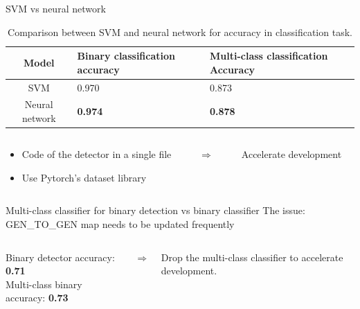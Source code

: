 \documentclass[11pt,compress]{beamer} %
\begin{document}
\begin{frame}{SVM vs neural network}
  \begin{table}[H]
    \centering
    \begin{tabular}{|c|p{}|p{}|}
        \hline
        Model & Binary classification accuracy & Multi-class classification Accuracy\\
        \hline
        SVM & 0.970 & 0.873\\
        \hline
        Neural network & \textbf{0.974} & \textbf{0.878}\\
        \hline
    \end{tabular}
    \caption{Comparison between SVM and neural network for accuracy in classification task.}
    \label{table:svmVsNN}
  \end{table}
  
  \pause
  \begin{columns}
    \begin{column}{.4\textwidth}
      \begin{itemize}
        \item Code of the detector in a single file
        \pause
        \item Use Pytorch's dataset library
      \end{itemize}
    \end{column}
    \pause
    \begin{column}{.05\textwidth}
      \Huge
      $\Rightarrow$
    \end{column}

    \begin{column}{.4\textwidth}
      Accelerate development
    \end{column}
  \end{columns}
\end{frame}

\begin{frame}{Multi-class classifier for binary detection vs binary classifier}
  The issue: GEN\_TO\_GEN map needs to be updated frequently\\
  \vspace*{.5cm}
  \begin{columns}
    \begin{column}{.5\textwidth}
      Binary detector accuracy: \textbf{0.71}\\
      Multi-class binary accuracy: \textbf{0.73} 
    \end{column}

    \begin{column}{.05\textwidth}
      \huge
      $\Rightarrow$
    \end{column}

    \begin{column}{.4\textwidth}
      Drop the multi-class classifier to accelerate development.
    \end{column}
  \end{columns}
\end{frame}
\end{document}
